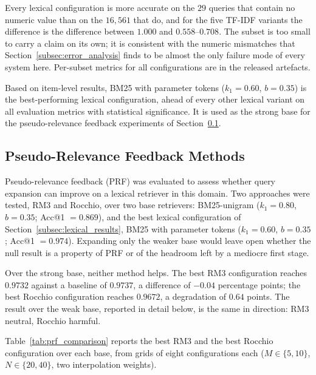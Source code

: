 \documentclass[preprint,12pt]{elsarticle}
\begin{document}


Every lexical configuration is more accurate on the $29$ queries that contain no numeric value than on the $16{,}561$ that do, and for the five TF-IDF variants the difference is the difference between $1.000$ and $0.558$--$0.708$. The subset is too small to carry a claim on its own; it is consistent with the numeric mismatches that Section~\ref{subsec:error_analysis} finds to be almost the only failure mode of every system here. Per-subset metrics for all configurations are in the released artefacts.



Based on item-level results, BM25 with parameter tokens ($k_1=0.60$, $b=0.35$) is the best-performing lexical configuration, ahead of every other lexical variant on all evaluation metrics with statistical significance. It is used as the strong base for the pseudo-relevance feedback experiments of Section~\ref{subsec:prf}.

\FloatBarrier
\subsection{Pseudo-Relevance Feedback Methods}
\label{subsec:prf}

Pseudo-relevance feedback (PRF) was evaluated to assess whether query expansion can improve on a lexical retriever in this domain. Two approaches were tested, RM3 and Rocchio, over two base retrievers: BM25-unigram ($k_1=0.80$, $b=0.35$; Acc@1 $=0.869$), and the best lexical configuration of Section~\ref{subsec:lexical_results}, BM25 with parameter tokens ($k_1=0.60$, $b=0.35$; Acc@1 $=0.974$). Expanding only the weaker base would leave open whether the null result is a property of PRF or of the headroom left by a mediocre first stage.

Over the strong base, neither method helps. The best RM3 configuration reaches $0.9732$ against a baseline of $0.9737$, a difference of $-0.04$ percentage points; the best Rocchio configuration reaches $0.9672$, a degradation of $0.64$ points. The result over the weak base, reported in detail below, is the same in direction: RM3 neutral, Rocchio harmful.

Table~\ref{tab:prf_comparison} reports the best RM3 and the best Rocchio configuration over each base, from grids of eight configurations each ($M \in \{5, 10\}$, $N \in \{20, 40\}$, two interpolation weights).


\end{document}
